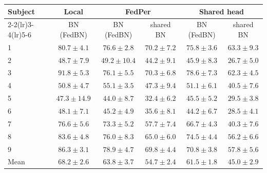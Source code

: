 \begin{tabular}{lccccc}
\toprule
Subject & \multicolumn{1}{c}{Local} & \multicolumn{2}{c}{FedPer} & \multicolumn{2}{c}{Shared head} \\
\cmidrule(lr){2-2}\cmidrule(lr){3-4}\cmidrule(lr){5-6}
 & BN (FedBN) & BN (FedBN) & shared BN & BN (FedBN) & shared BN \\
\midrule
1 & $\mathbf{80.7} \pm 4.1$ & $76.6 \pm 2.8$ & $70.2 \pm 7.2$ & $75.8 \pm 3.6$ & $63.3 \pm 9.3$ \\
2 & $48.7 \pm 7.9$ & $\mathbf{49.2} \pm 10.4$ & $44.2 \pm 9.1$ & $45.9 \pm 8.3$ & $26.7 \pm 5.0$ \\
3 & $\mathbf{91.8} \pm 5.3$ & $76.1 \pm 5.5$ & $70.3 \pm 6.8$ & $78.6 \pm 7.3$ & $62.3 \pm 4.5$ \\
4 & $50.8 \pm 4.7$ & $\mathbf{55.1} \pm 3.5$ & $47.3 \pm 9.4$ & $51.1 \pm 6.1$ & $40.5 \pm 7.6$ \\
5 & $\mathbf{47.3} \pm 14.9$ & $44.0 \pm 8.7$ & $32.4 \pm 6.2$ & $45.5 \pm 5.2$ & $29.5 \pm 3.8$ \\
6 & $\mathbf{48.1} \pm 7.1$ & $45.2 \pm 4.9$ & $35.6 \pm 8.1$ & $44.2 \pm 6.7$ & $28.5 \pm 4.1$ \\
7 & $\mathbf{76.6} \pm 5.6$ & $73.3 \pm 5.2$ & $57.7 \pm 7.4$ & $66.7 \pm 4.3$ & $40.3 \pm 7.6$ \\
8 & $\mathbf{83.6} \pm 4.8$ & $76.0 \pm 8.3$ & $65.0 \pm 6.0$ & $74.5 \pm 4.4$ & $56.2 \pm 6.6$ \\
9 & $\mathbf{86.3} \pm 3.1$ & $78.9 \pm 4.7$ & $69.8 \pm 4.4$ & $70.8 \pm 3.8$ & $57.8 \pm 5.6$ \\
\midrule
Mean & $\mathbf{68.2} \pm 2.6$ & $63.8 \pm 3.7$ & $54.7 \pm 2.4$ & $61.5 \pm 1.8$ & $45.0 \pm 2.9$ \\
\bottomrule
\end{tabular}
